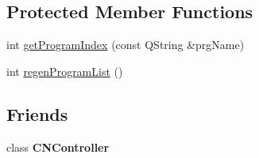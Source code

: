 \subsection*{Protected Member Functions}
\begin{DoxyCompactItemize}
\item 
int \hyperlink{classCNRobo_a54288fcc8a1bc452a37062c68f88abca}{get\-Program\-Index} (const Q\-String \&prg\-Name)
\item 
int \hyperlink{classCNRobo_a40ba55bb85300cb5db2458f185a6b6be}{regen\-Program\-List} ()
\end{DoxyCompactItemize}
\subsection*{Friends}
\begin{DoxyCompactItemize}
\item 
\hypertarget{classCNRobo_a12af29a2bfeaf177db1863a3d52bc77f}{class {\bfseries C\-N\-Controller}}\label{classCNRobo_a12af29a2bfeaf177db1863a3d52bc77f}

\end{DoxyCompactItemize}


